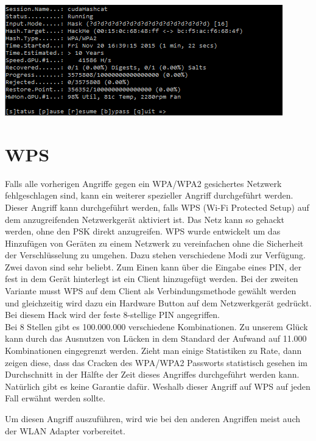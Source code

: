 \includegraphics[width=\textwidth]{bilder/wlan/cudaHashcatNUMSeriesCrack.png}\\



\section{WPS}

Falls alle vorherigen Angriffe gegen ein WPA/WPA2 gesichertes Netzwerk fehlgeschlagen sind, kann ein weiterer spezieller Angriff durchgeführt werden. Dieser Angriff kann durchgeführt werden, falls WPS (Wi-Fi Protected Setup) auf dem anzugreifenden Netzwerkgerät aktiviert ist. Das Netz kann so gehackt werden, ohne den PSK direkt anzugreifen. WPS wurde entwickelt um das Hinzufügen von Geräten zu einem Netzwerk zu vereinfachen ohne die Sicherheit der Verschlüsselung zu umgehen. Dazu stehen verschiedene Modi zur Verfügung. Zwei davon sind sehr beliebt. Zum Einen kann über die Eingabe eines PIN, der fest in dem Gerät hinterlegt ist ein Client hinzugefügt werden. Bei der zweiten Variante musst WPS auf dem Client als Verbindungsmethode gewählt werden und gleichzeitig wird dazu ein Hardware Button auf dem Netzwerkgerät gedrückt. Bei diesem Hack wird der feste 8-stellige PIN angegriffen. \\

Bei 8 Stellen gibt es 100.000.000 verschiedene Kombinationen. Zu unserem Glück kann durch das Ausnutzen von Lücken in dem Standard der Aufwand auf 11.000 Kombinationen eingegrenzt werden. Zieht man einige Statistiken zu Rate, dann zeigen diese, dass das Cracken des WPA/WPA2 Passworts statistisch gesehen im Durchschnitt in der Hälfte der Zeit dieses Angriffes durchgeführt werden kann. Natürlich gibt es keine Garantie dafür. Weshalb dieser Angriff auf WPS auf jeden Fall erwähnt werden sollte. 

Um diesen Angriff auszuführen, wird wie bei den anderen Angriffen meist auch der WLAN Adapter vorbereitet.\\


